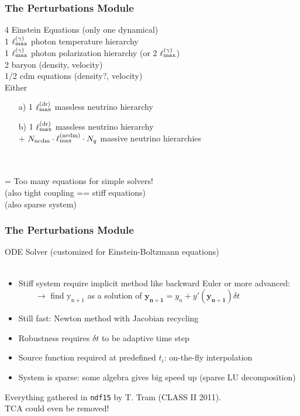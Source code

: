 \begin{frame}[fragile]
	\frametitle{The Perturbations Module}
	
	4 Einstein Equations (only one dynamical)\\
	1 $\ell^{(\gamma)}_{\rm max}$ photon temperature hierarchy \\
	1 $\ell^{(\gamma)}_{\rm max}$ photon polarization hierarchy (or 2 $\ell^{(\gamma)}_{\rm max}$) \\
	2 baryon (density, velocity) \\
	1/2 cdm equations (density?, velocity)\\
	Either
	\begin{itemize}
		\item[a)] 1 $\ell^{\mathrm{(dr)}}_{\rm max}$ massless neutrino hierarchy
		\item[b)] 1 $\ell^{\mathrm{(dr)}}_{\rm max}$ massless neutrino hierarchy \\+ $N_\mathrm{ncdm} \cdot \ell^{\mathrm{(ncdm)}}_{\rm max} \cdot N_q$ massive neutrino hierarchies
	\end{itemize}
	\mbox{}\\ \mbox{}\\
	= Too many equations for simple solvers!\\
	(also tight coupling == stiff equations)\\
	(also sparse system)
\end{frame}

\begin{frame}[fragile]
	\frametitle{The Perturbations Module}
	
	ODE Solver (customized for Einstein-Boltzmann equations)\\
	\mbox{}\\
	\begin{itemize}
		\item Stiff system require implicit method like backward Euler or more advanced:\\
		~~~~$\rightarrow$ find $\mathrm{y_{n+1}}$ as a solution of $\mathbf{y_{n+1}} = y_n + y'(\mathbf{y_{n+1}}) \delta t$
		\item Still fast: Newton method with Jacobian recycling 
		\item Robustness requires $\delta t$ to be adaptive time step
		\item Source function required at predefined $t_i$: on-the-fly interpolation
		\item System is sparse: some algebra gives big speed up (sparse LU decomposition)
	\end{itemize}
	Everything gathered in {\tt ndf15} by T. Tram (CLASS II 2011).\\ TCA could even be removed!
\end{frame}


